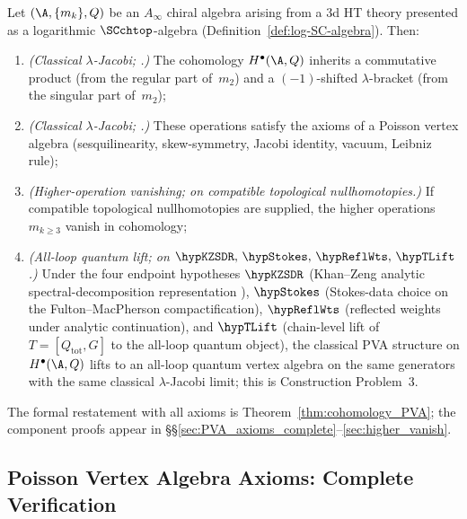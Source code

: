 \begin{maintheorem}
Let $(\A, \{m_k\}, Q)$ be an $A_\infty$ chiral algebra arising from a
3d HT theory presented as a logarithmic $\SCchtop$-algebra
(Definition~\ref{def:log-SC-algebra}). Then:
\begin{enumerate}[label=\textup{(\roman*)}]
\item \emph{(Classical $\lambda$-Jacobi; \ClaimStatusProvedHere.)}
 The cohomology $H^\bullet(\A,Q)$ inherits a commutative product
 \textup(from the regular part of~$m_2$\textup) and a
 $(-1)$-shifted $\lambda$-bracket
 \textup(from the singular part of~$m_2$\textup);
\item \emph{(Classical $\lambda$-Jacobi; \ClaimStatusProvedHere.)}
 These operations satisfy the axioms of a Poisson vertex algebra
 \textup(sesquilinearity, skew-symmetry, Jacobi identity, vacuum,
 Leibniz rule\textup);
\item \emph{(Higher-operation vanishing; \ClaimStatusConditional{} on
 compatible topological nullhomotopies.)}
 If compatible topological nullhomotopies are supplied, the
 higher operations $m_{k \geq 3}$ vanish in cohomology;
\item \emph{(All-loop quantum lift; \ClaimStatusConditional{} on
 $\hypKZSDR,\,\hypStokes,\,\hypReflWts,\,\hypTLift$.)}
 Under the four endpoint hypotheses
 $\hypKZSDR$ (Khan--Zeng analytic spectral-decomposition
 representation \cite{KZ25}),
 $\hypStokes$ (Stokes-data choice on the Fulton--MacPherson
 compactification),
 $\hypReflWts$ (reflected weights under analytic continuation),
 and $\hypTLift$ (chain-level lift of $T = [Q_{\mathrm{tot}}, G]$
 to the all-loop quantum object),
 the classical PVA structure on $H^\bullet(\A,Q)$ lifts to an
 all-loop quantum vertex algebra on the same generators with the
 same classical $\lambda$-Jacobi limit; this is Construction
 Problem~3.
\end{enumerate}
\end{maintheorem}

The formal restatement with all axioms is
Theorem~\ref{thm:cohomology_PVA}; the component proofs appear in
\S\S\ref{sec:PVA_axioms_complete}--\ref{sec:higher_vanish}.

\subsection{Poisson Vertex Algebra Axioms: Complete Verification}

